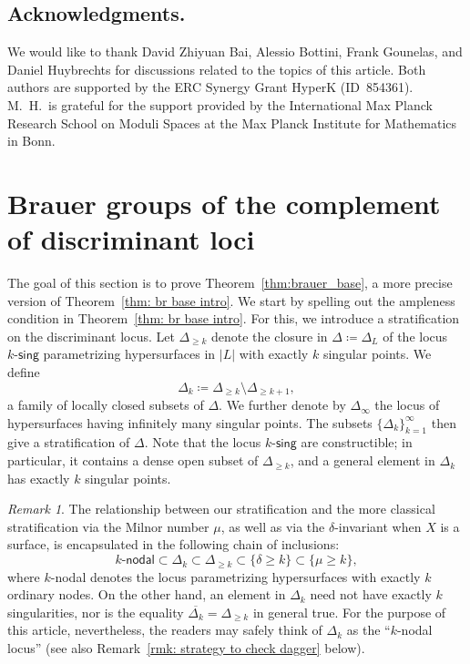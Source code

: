 \documentclass[11pt]{amsart}
\theoremstyle{plain}
\theoremstyle{definition}
\theoremstyle{remark}
\newtheorem{rmk}[thm]{Remark}
\begin{document}
\subsection{Acknowledgments.} We would like to thank David Zhiyuan Bai, Alessio Bottini, Frank Gounelas, and Daniel Huybrechts for discussions related to the topics of this article. Both authors are supported by the ERC
Synergy Grant HyperK (ID~854361). M.\ H.\ is grateful for the support provided by the International Max Planck Research School on Moduli Spaces at the Max Planck Institute for Mathematics in Bonn.


\section{Brauer groups of the complement of discriminant loci}\label{sec: brauer group}

The goal of this section is to prove Theorem~\ref{thm:brauer_base}, a more precise version of Theorem~\ref{thm: br base intro}. We start by spelling out the ampleness condition in Theorem~\ref{thm: br base intro}. For this, we introduce a stratification on the discriminant locus. Let $\Delta_{\geq k}$ denote the closure in $\Delta \coloneq \Delta_L$ of the locus $k\textsf{-sing}$ parametrizing hypersurfaces in $|L|$ with {exactly} $k$ singular points. We define 
\[
\Delta_k \coloneq \Delta_{\geq k} \setminus \Delta_{\geq k+1},
\]
a family of locally closed subsets of $\Delta$. We further denote by $\Delta_\infty$ the locus of hypersurfaces having infinitely many singular points. The subsets $\{\Delta_k\}_{k=1}^\infty$ then give a stratification of $\Delta$. Note that the locus $k\textsf{-sing}$ are constructible; in particular, it contains a dense open subset of $\Delta_{\geq k}$, and a general element in $\Delta_k$ has exactly $k$ singular points.

\begin{rmk}\label{rmk: mu and delta}
    The relationship between our stratification and the more classical stratification via the Milnor number $\mu$, as well as via the $\delta$-invariant when $X$ is a surface, is encapsulated in the following chain of inclusions:
    \begin{equation}\label{eq: chain of inclusions}
    k \textsf{-nodal} \subset \Delta_k \subset \Delta_{\geq k} \subset \{\delta \geq k\} \subset \{\mu \geq k\},
    \end{equation}
where $k$\textsf{-nodal} denotes the locus parametrizing hypersurfaces with exactly $k$ ordinary nodes. On the other hand, an element in $\Delta_k$ need not have exactly $k$ singularities, nor is the equality $\overline{\Delta_k} = \Delta_{\geq k}$ in general true. For the purpose of this article, nevertheless, the readers may safely think of $\Delta_k$ as the ``$k$-nodal locus'' (see also Remark~\ref{rmk: strategy to check dagger} below).
\end{rmk}
\end{document}
